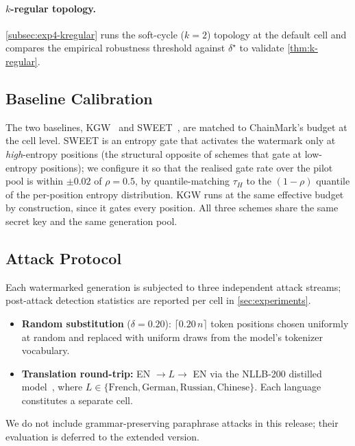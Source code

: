 \paragraph{$k$-regular topology.} \autoref{subsec:exp4-kregular}
runs the soft-cycle ($k=2$) topology at the default cell and
compares the empirical robustness threshold against $\delta^\star$
to validate \autoref{thm:k-regular}.

\subsection{Baseline Calibration}

The two baselines, KGW~\citep{kirchenbauer2023watermark} and
SWEET~\citep{lee2023sweet}, are matched to ChainMark's budget at the
cell level. SWEET is an entropy gate that activates the watermark
only at \emph{high}-entropy positions (the structural opposite of
schemes that gate at low-entropy positions); we configure it so
that the realised gate rate over the pilot pool is within
$\pm 0.02$ of $\rho = 0.5$, by quantile-matching $\tau_H$ to the
$(1-\rho)$ quantile of the per-position entropy distribution. KGW
runs at the same effective budget by construction, since it gates
every position. All three schemes share the same secret key and
the same generation pool.

\subsection{Attack Protocol}

Each watermarked generation is subjected to three independent
attack streams; post-attack detection statistics are reported per
cell in \autoref{sec:experiments}.
\begin{itemize}[leftmargin=1.2em, itemsep=1pt, topsep=2pt]
  \item \textbf{Random substitution} ($\delta = 0.20$):
    $\lceil 0.20\, n \rceil$ token positions chosen uniformly at
    random and replaced with uniform draws from the model's
    tokenizer vocabulary.
  \item \textbf{Translation round-trip:} EN $\to L \to$ EN via
    the NLLB-200 distilled model~\citep{nllbteam2022nllb}, where
    $L \in \{\text{French}, \text{German}, \text{Russian}, \text{Chinese}\}$.
    Each language constitutes a separate cell.
\end{itemize}
We do not include grammar-preserving paraphrase attacks in this
release; their evaluation is deferred to the extended version.

